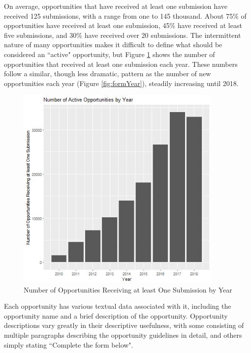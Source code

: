 \documentclass[]{report}   %
\begin{document}
\FloatBarrier
On average, opportunities that have received at least one submission have received 125 submissions, with a range from one to 145 thousand. About 75\% of opportunities have received at least one submission, 45\% have received at least five submissions, and 30\% have received over 20 submissions. The intermittent nature of many opportunities makes it difficult to define what should be considered an ``active" opportunity, but Figure \ref{fig:activeForms} shows the number of opportunities that received at least one submission each year. These numbers follow a similar, though less dramatic, pattern as the number of new opportunities each year (Figure \ref{fig:formYear}), steadily increasing until 2018.

\begin{figure}[h]
    \centering
    \begin{minipage}{0.45\textwidth}
	\captionsetup{font=scriptsize}
        \centering
        \includegraphics[width=0.9\textwidth]{activeForms_plot.jpg} %
        \caption{Number of Opportunities Receiving at least One Submission by Year}
	  \label{fig:activeForms}
    \end{minipage}\hfill
\end{figure}
\FloatBarrier

Each opportunity has various textual data associated with it, including the opportunity name and a brief description of the opportunity. Opportunity descriptions vary greatly in their descriptive usefulness, with some consisting of multiple paragraphs describing the opportunity guidelines in detail, and others simply stating ``Complete the form below". 
\end{document}
